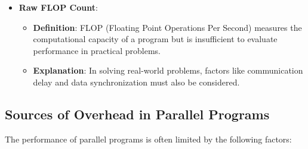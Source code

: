 \documentclass[12pt,a4paper]{article}
\begin{document}
\begin{itemize}
    \item \textbf{Raw FLOP Count}:
    \begin{itemize}
        \item \textbf{Definition}: FLOP (Floating Point Operations Per Second) measures the computational capacity of a program but is insufficient to evaluate performance in practical problems.
        \item \textbf{Explanation}: In solving real-world problems, factors like communication delay and data synchronization must also be considered.
    \end{itemize}
\end{itemize}

\subsection{Sources of Overhead in Parallel Programs}

The performance of parallel programs is often limited by the following factors:
\end{document}
